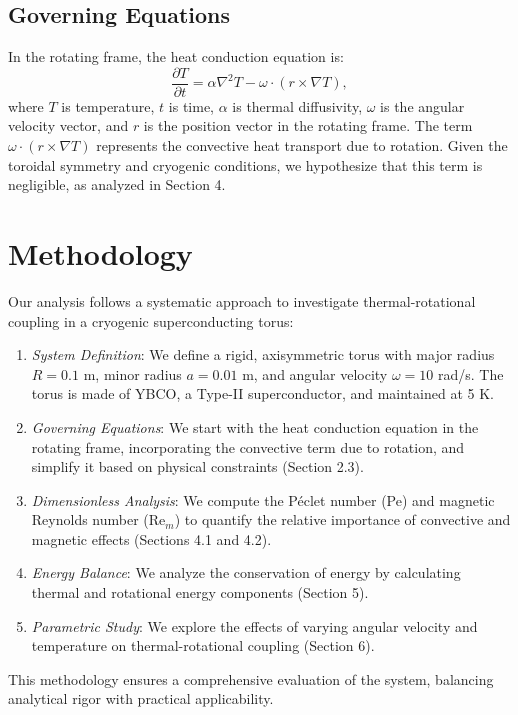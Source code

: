 \documentclass[12pt]{article}
\begin{document}
\subsection{Governing Equations}
In the rotating frame, the heat conduction equation is:
\begin{equation}
    \frac{\partial T}{\partial t} = \alpha \nabla^2 T - \omega \cdot (r \times \nabla T),
\end{equation}
where $T$ is temperature, $t$ is time, $\alpha$ is thermal diffusivity, $\omega$ is the angular velocity vector, and $r$ is the position vector in the rotating frame. The term $\omega \cdot (r \times \nabla T)$ represents the convective heat transport due to rotation. Given the toroidal symmetry and cryogenic conditions, we hypothesize that this term is negligible, as analyzed in Section 4.

\section{Methodology}
Our analysis follows a systematic approach to investigate thermal-rotational coupling in a cryogenic superconducting torus:
\begin{enumerate}
    \item \textit{System Definition}: We define a rigid, axisymmetric torus with major radius $R = 0.1$ m, minor radius $a = 0.01$ m, and angular velocity $\omega = 10$ rad/s. The torus is made of YBCO, a Type-II superconductor, and maintained at 5 K.
    \item \textit{Governing Equations}: We start with the heat conduction equation in the rotating frame, incorporating the convective term due to rotation, and simplify it based on physical constraints (Section 2.3).
    \item \textit{Dimensionless Analysis}: We compute the Péclet number (Pe) and magnetic Reynolds number (Re$_m$) to quantify the relative importance of convective and magnetic effects (Sections 4.1 and 4.2).
    \item \textit{Energy Balance}: We analyze the conservation of energy by calculating thermal and rotational energy components (Section 5).
    \item \textit{Parametric Study}: We explore the effects of varying angular velocity and temperature on thermal-rotational coupling (Section 6).
\end{enumerate}
This methodology ensures a comprehensive evaluation of the system, balancing analytical rigor with practical applicability.
\end{document}
